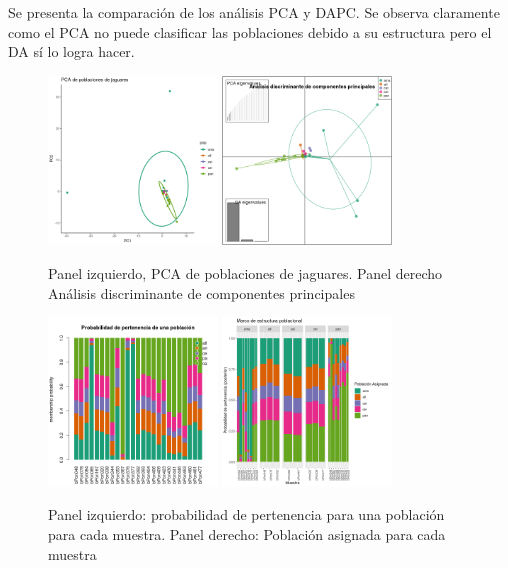 \documentclass{article}
\begin{document}
Se presenta la comparación de los análisis PCA y DAPC. Se observa claramente como el PCA no puede clasificar las poblaciones debido a su estructura pero el DA sí lo logra hacer. 


\begin{figure}[h]
    \centering
    \includegraphics[width=0.4\textwidth]{PCA_plot.png}
    \includegraphics[width=0.4\textwidth]{DAPC.png}
    \caption{Panel izquierdo, PCA de poblaciones de jaguares. Panel derecho Análisis discriminante de componentes principales}
    \label{fig:PCA_DA}
\end{figure}



\begin{figure}[ht]
    \centering
    \includegraphics[width=0.4\textwidth]{compoplot.png}
    \includegraphics[width=0.4\textwidth]{estructura_poblacional.png}
    \caption{Panel izquierdo: probabilidad de pertenencia para una población para cada muestra. Panel derecho: Población asignada para cada muestra}
    \label{fig:estructura}
\end{figure}
\end{document}
